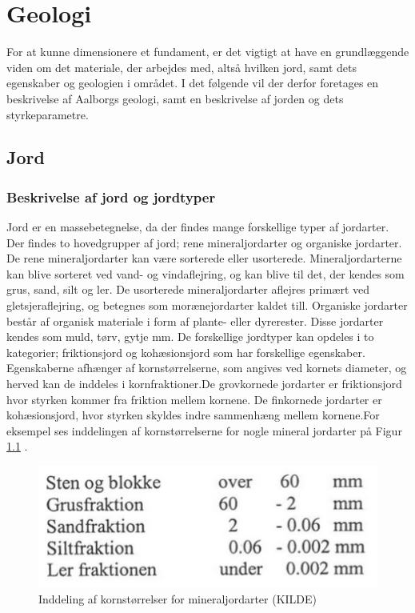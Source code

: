 \chapter{Geologi}
For at kunne dimensionere et fundament, er det vigtigt at have en grundlæggende viden om det materiale, der arbejdes med, altså hvilken jord, samt dets egenskaber og geologien i området. I det følgende vil der derfor foretages en beskrivelse af Aalborgs geologi, samt en beskrivelse af jorden og dets styrkeparametre.

\section{Jord}
\subsection{Beskrivelse af jord og jordtyper}
Jord er en massebetegnelse, da der findes mange forskellige typer af jordarter. Der findes to hovedgrupper af jord; rene mineraljordarter og organiske jordarter. 
\newline \indent{     }  De rene mineraljordarter kan være sorterede eller usorterede. Mineraljordarterne kan blive sorteret ved vand- og vindaflejring, og kan blive til det, der kendes som grus, sand, silt og ler. De usorterede mineraljordarter aflejres primært ved gletsjeraflejring, og betegnes som morænejordarter kaldet till.\citep{jordarter}
\newline \indent{     }  Organiske jordarter består af organisk materiale i form af plante- eller dyrerester. Disse jordarter kendes som muld, tørv, gytje mm.\citep{miljo}
\newline \indent{     } De forskellige jordtyper kan opdeles i to kategorier; friktionsjord og kohæsionsjord som har forskellige egenskaber. Egenskaberne afhænger af kornstørrelserne, som angives ved kornets diameter, og herved kan de inddeles i kornfraktioner\citep{geoteknik}.De grovkornede jordarter er friktionsjord hvor styrken kommer fra friktion mellem kornene. De finkornede jordarter er kohæsionsjord, hvor styrken skyldes indre sammenhæng mellem kornene.For eksempel ses inddelingen af kornstørrelserne for nogle mineral jordarter på Figur \ref{fig:kornstorrelser} .

\begin{figure}[htbp] \centering
	\begin{minipage}[b]{0.48\textwidth}\centering
		\includegraphics[width=1.0\textwidth]{billeder/kornetsdiameter.png}
		\caption{Inddeling af kornstørrelser for mineraljordarter (KILDE)}
		\label{fig:kornstorrelser}
	\end{minipage}\hfill
\end{figure}

